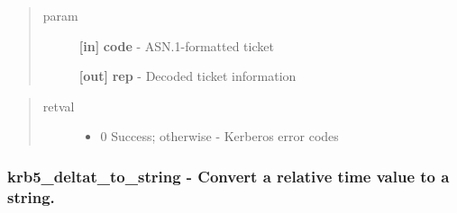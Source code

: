 \documentclass[letterpaper,10pt,english]{sphinxmanual}
\begin{document}
\begin{fulllineitems}
\label{appdev/refs/api/krb5_decode_ticket:c.krb5_decode_ticket}
\end{fulllineitems}

\begin{quote}\begin{description}
\item[{param}] \leavevmode
\textbf{{[}in{]}} \textbf{code} - ASN.1-formatted ticket

\textbf{{[}out{]}} \textbf{rep} - Decoded ticket information

\end{description}\end{quote}
\begin{quote}\begin{description}
\item[{retval}] \leavevmode\begin{itemize}
\item {} 
0   Success; otherwise - Kerberos error codes

\end{itemize}

\end{description}\end{quote}


\subsubsection{krb5\_deltat\_to\_string -  Convert a relative time value to a string.}
\label{appdev/refs/api/krb5_deltat_to_string::doc}\label{appdev/refs/api/krb5_deltat_to_string:krb5-deltat-to-string-convert-a-relative-time-value-to-a-string}

\begin{fulllineitems}
\label{appdev/refs/api/krb5_deltat_to_string:c.krb5_deltat_to_string}
\end{fulllineitems}
\end{document}
